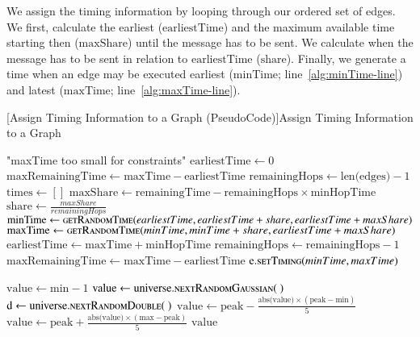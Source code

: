 We assign the timing information by looping through our ordered set of edges. We first, calculate the earliest ($\text{earliestTime}$) and the maximum available time starting then ($\text{maxShare}$) until the message has to be sent. We calculate when the message has to be sent in relation to $\text{earliestTime}$ ($\text{share}$). Finally, we generate a time when an edge may be executed earliest ($\text{minTime}$; line~\ref{alg:minTime-line}) and latest ($\text{maxTime}$; line~\ref{alg:maxTime-line}).


\begin{breakablealgorithm}
	[Assign Timing Information to a Graph (PseudoCode)]{Assign Timing Information to a Graph}\label{alg:simpleTiming}
	\begin{algorithmic}[1]
		\label{alg:assignTiming-line}
				\Throw "maxTime too small for constraints"
			\EndIf
			\State $\text{earliestTime} \gets 0$
			\State $\text{maxRemainingTime} \gets \text{maxTime}-\text{earliestTime}$
			\State $\text{remainingHops} \gets \text{len(edges)} - 1$
			\State $\text{times} \gets []$
				\State $\text{maxShare} \gets \text{remainingTime} - \text{remainingHops}\times\text{minHopTime}$
				\State $\text{share} \gets \frac{maxShare}{remainingHops}$
				\State $\text{minTime} \gets \Call{getRandomTime}{earliestTime, earliestTime+share, earliestTime+maxShare}$\label{alg:minTime-line}
				\State $\text{maxTime} \gets \Call{getRandomTime}{minTime, minTime+share, earliestTime+maxShare}$\label{alg:maxTime-line}
				\State $\text{earliestTime} \gets \text{maxTime}+\text{minHopTime}$
				\State $\text{remainingHops} \gets \text{remainingHops} - 1$
				\State $\text{maxRemainingTime} \gets \text{maxTime}-\text{earliestTime}$
				\State $\text{e}.\Call{setTiming}{minTime, maxTime}$
			\EndFor
		\EndProcedure
		\item[]		
		\label{alg:getRandomTime-line}
			\State $\text{value} \gets \text{min}-1$
				\State $\text{value} \gets \text{universe}.\Call{nextRandomGaussian}{~}$
				\State $\text{d} \gets \text{universe}.\Call{nextRandomDouble}{~}$
					\State $\text{value} \gets \text{peak} - \frac{\text{abs(value)} \times (\text{peak} - \text{min})}{5}$
				\Else
					\State $\text{value} \gets \text{peak} + \frac{\text{abs(value)} \times (\text{max} - \text{peak})}{5}$
				\EndIf
			\EndWhile
			\Return $\text{value}$
		\EndFunction
	\end{algorithmic}
\end{breakablealgorithm}

